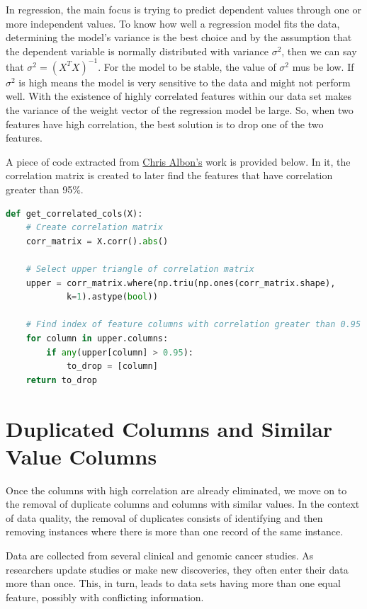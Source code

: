 In regression, the main focus is trying to predict dependent values through one or more independent values. To know how well a regression model fits the data, determining the model's variance is the best choice and by the assumption that the dependent variable is normally distributed with variance \(\sigma^2\), then we can say that \(\sigma^2 = (X^TX)^{-1}\). For the model to be stable, the value of \(\sigma^2\) mus be low. If \(\sigma^2\) is high means the model is very sensitive to the data and might not perform well. With the existence of highly correlated features within our data set makes the variance of the weight vector of the regression model be large. So, when two features have high correlation, the best solution is to drop one of the two features.

A piece of code extracted from \href{https://chrisalbon.com/code/machine_learning/feature_selection/drop_highly_correlated_features/}{Chris Albon’s} work is provided below. In it, the correlation matrix is created to later find the features that have correlation greater than 95\%.

\begin{lstlisting}[language=Python]
def get_correlated_cols(X):
    # Create correlation matrix
    corr_matrix = X.corr().abs()

    # Select upper triangle of correlation matrix
    upper = corr_matrix.where(np.triu(np.ones(corr_matrix.shape),
            k=1).astype(bool))
            
    # Find index of feature columns with correlation greater than 0.95
    for column in upper.columns:
        if any(upper[column] > 0.95):
            to_drop = [column]
    return to_drop
\end{lstlisting}


\section{Duplicated Columns and Similar Value Columns}
\label{sec:duplicated_similar_columns}
\hspace{10px}Once the columns with high correlation are already eliminated, we move on to the removal of duplicate columns and columns with similar values. In the context of data quality, the removal of duplicates consists of identifying and then removing instances where there is more than one record of the same instance.

Data are collected from several clinical and genomic cancer studies. As researchers update studies or make new discoveries, they often enter their data more than once. This, in turn, leads to data sets having more than one equal feature, possibly with conflicting information.

